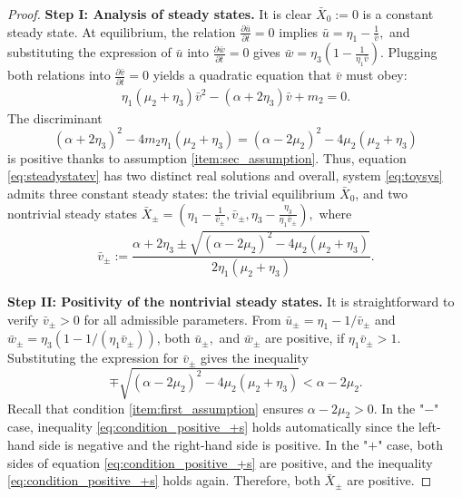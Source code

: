 \documentclass[12pt, a4paper]{amsart}
\numberwithin{equation}{section}
\newcommand{\CSS}{\bar{X}}
\def\be{\begin{equation}}
\def\ee{\end{equation}}
\def\del{\partial}
\begin{document}
\begin{proof} \textbf{Step I: Analysis of steady states.} 
It is clear $\CSS_0 := 0$ is a constant steady state. At equilibrium, the relation $\frac{\del \bar u}{\del t} = 0$ implies $\bar u = \eta_1 - \frac{1}{\bar v},$ and substituting the expression of $\bar u$ into $\frac{\del \bar w}{\del t} = 0$ gives
\mbox{$\bar w = \eta_3 (1 - \frac{1}{\eta_1 \bar v}).$}
Plugging both relations into $\frac{\del \bar v}{\del t} = 0$ yields a quadratic equation that $\bar v$ must obey:
\begin{align}\label{eq:steadystatev}
    \eta_1(\mu_2 + \eta_3) \bar v^2 - (\alpha + 2\eta_3) \bar v + m_2 = 0.
\end{align}
The discriminant
\begin{equation}\label{eq:existssteadystate}
(\alpha + 2\eta_3)^2 - 4 m_2\eta_1 (\mu_2 + \eta_3) = (\alpha-2\mu_2)^2 - 4 \mu_2 (\mu_2 + \eta_3)
\end{equation}
is positive thanks to  assumption \ref{item:sec_assumption}.
Thus, equation \eqref{eq:steadystatev} has two distinct real solutions and overall, system \eqref{eq:toysys} admits three constant steady states: the trivial equilibrium $\CSS_0$,  and two nontrivial steady states $\CSS_\pm = (\eta_1 - \frac{1}{\bar v_\pm}, \bar v_\pm, \eta_3  - \frac{\eta_3}{\eta_1 \bar v_\pm}),$ where
\begin{align*}
\bar v_\pm := \dfrac{\alpha + 2\eta_3 \pm  \sqrt{(\alpha-2\mu_2)^2 - 4 \mu_2 (\mu_2 + \eta_3)}}{2 \eta_1 (\mu_2 + \eta_3)}.
\end{align*}

\vspace{1em}
\noindent
\textbf{Step II: Positivity of the nontrivial steady states.}
It is straightforward to verify $\bar v_\pm > 0$ for all admissible parameters.
From $\bar u_\pm = \eta_1 - 1/\bar v_\pm$ and $\bar w_\pm = \eta_3 (1 - 1/(\eta_1 \bar v_\pm))$, both $\bar u_\pm,$ and $\bar w_\pm$ are positive, if $\eta_1 \bar v_\pm > 1$.
Substituting the expression for $\bar v_\pm$ gives the inequality
\be\label{eq:condition_positive_+s}\mp \sqrt{(\alpha-2\mu_2)^2 - 4\mu_2(\mu_2 + \eta_3)} < \alpha - 2\mu_2.\ee
Recall that condition \ref{item:first_assumption} ensures $\alpha - 2\mu_2 > 0$. 
In the "$-$" case, inequality \eqref{eq:condition_positive_+s} holds automatically since the left-hand side is negative and the right-hand side is positive.
In the "$+$" case, both sides of equation \eqref{eq:condition_positive_+s} are positive, and the inequality \eqref{eq:condition_positive_+s} holds again. Therefore, both $\CSS_\pm$ are positive.


\end{proof}
\end{document}
